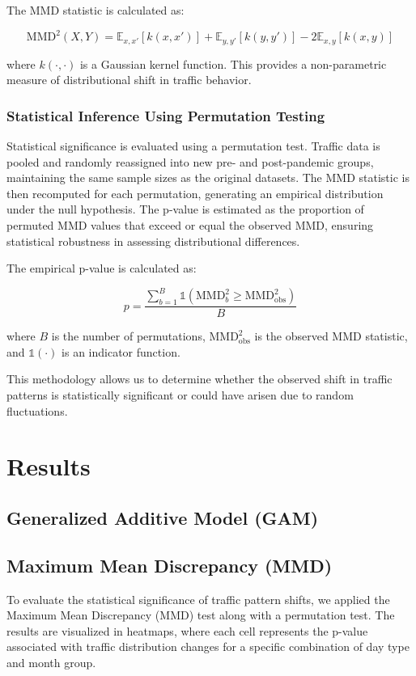\documentclass{article}
\begin{document}
The MMD statistic is calculated as:

\[
\text{MMD}^2(X, Y) = \mathbb{E}_{x,x'}[k(x, x')] + \mathbb{E}_{y,y'}[k(y, y')] - 2\mathbb{E}_{x,y}[k(x, y)]
\]

where \( k(\cdot, \cdot) \) is a Gaussian kernel function. This provides a non-parametric measure of distributional shift in traffic behavior.

\subsubsection{Statistical Inference Using Permutation Testing}

Statistical significance is evaluated using a permutation test. Traffic data is pooled and randomly reassigned into new pre- and post-pandemic groups, maintaining the same sample sizes as the original datasets. The MMD statistic is then recomputed for each permutation, generating an empirical distribution under the null hypothesis. The p-value is estimated as the proportion of permuted MMD values that exceed or equal the observed MMD, ensuring statistical robustness in assessing distributional differences.

The empirical p-value is calculated as:

\[
p = \frac{\sum_{b=1}^{B} \mathbb{1}(\text{MMD}^2_b \geq \text{MMD}^2_{\text{obs}})}{B}
\]

where \( B \) is the number of permutations, \( \text{MMD}^2_{\text{obs}} \) is the observed MMD statistic, and \( \mathbb{1}(\cdot) \) is an indicator function.

This methodology allows us to determine whether the observed shift in traffic patterns is statistically significant or could have arisen due to random fluctuations.

\section{Results}

\subsection{Generalized Additive Model (GAM)}

\subsection{Maximum Mean Discrepancy (MMD)}

To evaluate the statistical significance of traffic pattern shifts, we applied the Maximum Mean Discrepancy (MMD) test along with a permutation test. The results are visualized in heatmaps, where each cell represents the p-value associated with traffic distribution changes for a specific combination of day type and month group.
\end{document}
